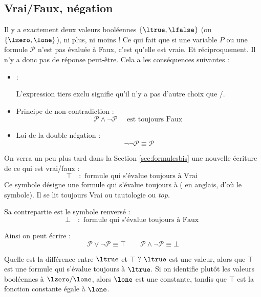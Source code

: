 \documentclass[11pt,class=report,crop=false]{standalone}
\begin{document}
\subsection{Vrai/Faux, négation}

Il y a exactement deux valeurs booléennes $\{\ltrue, \lfalse\}$ (ou $\{\lzero, \lone\}$), ni plus, ni moins ! Ce qui fait que si une variable $P$ ou une formule $\mathcal{P}$ n'est pas évaluée à Faux, c'est qu'elle est vraie. Et réciproquement. Il n'y a donc pas de réponse \og{}peut-être\fg{}.
Cela a les conséquences suivantes :
\begin{itemize}
	\item {} :

L'expression \og{}tiers exclu\fg{} signifie qu'il n'y a pas d'autre choix que \ltrue/\lfalse.

	\item Principe de non-contradiction :
\[ \mathcal{P} \land \lnot \mathcal{P} \quad \text{ est toujours Faux } \]

	\item Loi de la double négation :
\[ \lnot\lnot \mathcal{P} \equiv \mathcal{P}\]
	
\end{itemize}

On verra un peu plus tard dans la Section \ref{sec:formulesbis} une nouvelle écriture de ce qui est vrai/faux :
\[ \top \quad : \text{ formule qui s'évalue toujours à Vrai }\]
Ce symbole désigne une formule qui s'évalue toujours à \ltrue{} (\ltruetrue{} en anglais, d'où le symbole). Il se lit \og{}toujours Vrai\fg{} ou \og{}tautologie\fg{} ou \emph{top}.

Sa contrepartie est le symbole renversé :
\[ \bot \quad : \text{ formule qui s'évalue toujours à Faux }\]

Ainsi on peut écrire :
\[ \mathcal{P} \lor \lnot \mathcal{P} \equiv \top \qquad \mathcal{P} \land \lnot \mathcal{P} \equiv \bot\]


Quelle est la différence entre $\ltrue$ et $\top$ ?
$\ltrue$ est une valeur, alors que $\top$ est une formule qui s'évalue toujours à $\ltrue$.
Si on identifie plutôt les valeurs booléennes à $\lzero/\lone$, alors $\lone$ est une constante, tandis que $\top$ est la fonction constante égale à $\lone$.

\end{document}
